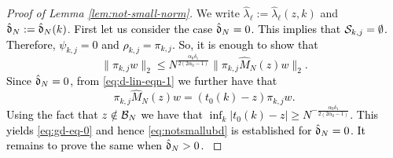 \documentclass{amsart}
\numberwithin{equation}{section}
\def\corABrev{\textcolor{black}}
\begin{document}
\begin{proof}[Proof of Lemma \ref{lem:not-small-norm}]
  We write $\hat{\lambda}_\ell:= \hat{\lambda}_\ell(z,k)$ and $\hat{\mathfrak{d}}_N:=
 \hat{\mathfrak{d}}_N(k)$. \corABrev{First let us consider the case $\hat {\mathfrak{d}}_N=0$. This implies that $\mathcal{S}_{k,j}=\emptyset$. Therefore, $\psi_{k,j}=0$ and $\rho_{k,j}=\pi_{k,j}$. So, it is enough to show that
 \begin{equation}\label{eq:gd-eq-0}
 \|\pi_{k,j} w\|_2 \le N^{\frac{\alpha_0 \delta_1}{2(2\alpha_0 -1)}} \|\pi_{k,j} \hat M_N(z) w\|_2. 
 \end{equation}
 Since $\hat {\mathfrak{d}}_N=0$, from \eqref{eq:d-lin-eqn-1} we further have that 
 \[
 \pi_{k,j} \hat M_N(z) w =(t_0(k)-z) \pi_{k,j} w.
 \]
 Using the fact that $z \notin \mathcal{B}_N$ we have that $\inf_k|t_0(k) -z| \ge N^{-\frac{\alpha_0 \delta_1}{2(2\alpha_0 -1)}}$. This yields \eqref{eq:gd-eq-0} and hence \eqref{eq:notsmallubd} is established for $\hat {\mathfrak{d}}_N =0$. It remains to prove the same when $\hat {\mathfrak{d}}_N >0$. 
 }
 


\end{proof}
\end{document}

